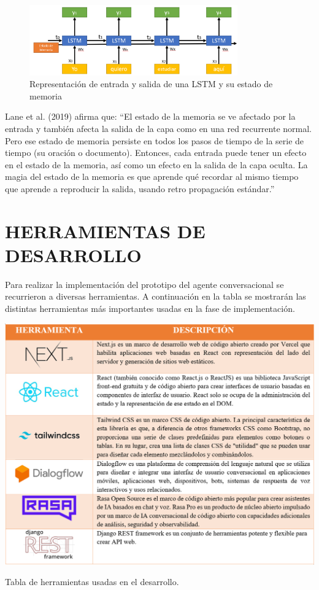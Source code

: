 \documentclass[letter, openright, 12pt]{book}
\begin{document}
\begin{figure}[H]
\includegraphics[width=0.8\textwidth]{figura2_9}
\caption{Representación de entrada y salida de una LSTM y su estado de memoria }
\label{tab:figura2_9} 
\end{figure}

Lane et al. (2019) afirma que: “El estado de la memoria se ve afectado por la entrada y también afecta la salida de la capa como en una red recurrente normal. Pero ese estado de memoria persiste en todos los pasos de tiempo de la serie de tiempo (su oración o documento). Entonces, cada entrada puede tener un efecto en el estado de la memoria, así como un efecto en la salida de la capa oculta. La magia del estado de la memoria es que aprende qué recordar al mismo tiempo que aprende a reproducir la salida, usando retro propagación estándar.”

\section{HERRAMIENTAS DE DESARROLLO}

Para realizar la implementación del prototipo del agente conversacional se recurrieron a diversas herramientas. A continuación en la tabla se mostrarán las distintas herramientas más importantes usadas en la fase de implementación.

\begin{table}[H]
\includegraphics[width=1\textwidth]{tabla2_2}
\caption{Tabla de herramientas usadas en el desarrollo.}
\label{tab:tabla2_2} 
\end{table}
\end{document}
